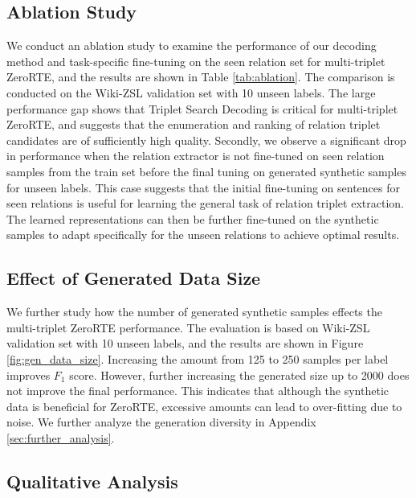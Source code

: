 \documentclass[11pt]{article}
\begin{document}
\subsection{Ablation Study}
We conduct an ablation study to examine the performance of our decoding method and task-specific fine-tuning on the seen relation set for multi-triplet ZeroRTE, and the results are shown in Table \ref{tab:ablation}. 
The comparison is conducted on the Wiki-ZSL validation set with 10 unseen labels.
The large performance gap shows that Triplet Search Decoding is critical for multi-triplet ZeroRTE, and suggests that the enumeration and ranking of relation triplet candidates are of sufficiently high quality.
Secondly, we observe a significant drop in performance when the relation extractor is not fine-tuned on seen relation samples from the train set before the final tuning on generated synthetic samples for unseen labels.
This case suggests that the initial fine-tuning on sentences for seen relations is useful for learning the general task of relation triplet extraction.
The learned representations can then be further fine-tuned on the synthetic samples to adapt specifically for the unseen relations to achieve optimal results.






\subsection{Effect of Generated Data Size}
We further study how the number of generated synthetic samples effects the multi-triplet ZeroRTE performance.
The evaluation is based on Wiki-ZSL validation set with 10 unseen labels, and the results are shown in Figure \ref{fig:gen_data_size}. 
Increasing the amount from 125 to 250 samples per label improves $F_{1}$ score.
However, further increasing the generated size up to 2000 does not improve the final performance.
This indicates that although the synthetic data is beneficial for ZeroRTE, excessive amounts can lead to over-fitting due to noise.
We further analyze the generation diversity in Appendix \ref{sec:further_analysis}.


\subsection{Qualitative Analysis}
\label{sec:case}
\end{document}
